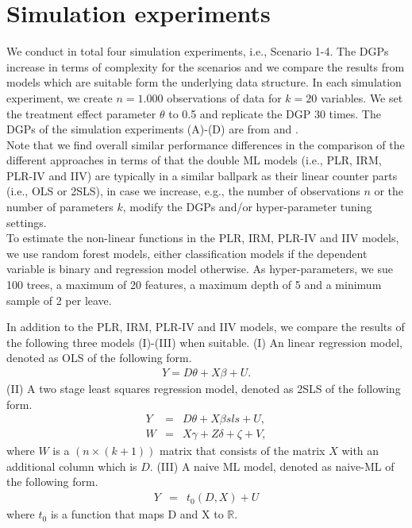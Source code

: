 \documentclass[10pt]{article}
\begin{document}
\section{Simulation experiments}
We conduct in total four simulation experiments, i.e., Scenario 1-4. 
The DGPs increase in terms of complexity for the scenarios and we compare the results from models which are suitable form the underlying data structure.
In each simulation experiment, we create $n=1.000$ observations of data for $k=20$ variables.
We set the treatment effect parameter $\theta$ to 0.5 and replicate the DGP 30 times.
The DGPs of the simulation experiments (A)-(D) are from \cite{Bach2022} and \cite{Bach2021}.\\

Note that we find overall similar performance differences in the comparison of the different approaches in terms of that the double ML models (i.e., PLR, IRM, PLR-IV and IIV) are typically in a similar ballpark as their linear counter parts (i.e., OLS or 2SLS), in case we increase, e.g., the number of observations $n$ or the number of parameters $k$, modify the DGPs and/or hyper-parameter tuning settings.\\


To estimate the non-linear functions in the PLR, IRM, PLR-IV and IIV models, we use random forest models, either classification models if the dependent variable is binary and regression model otherwise.
As hyper-parameters, we sue  100 trees, a maximum of 20 features, a maximum depth of 5 and a minimum sample of 2 per leave.

In addition to the PLR, IRM, PLR-IV and IIV models, we compare the results of the following three models (I)-(III) when suitable.
(I) An linear regression model, denoted as OLS of the following form. 
\begin{eqnarray*}\label{ols}
	Y= D \theta + X \beta + U.
\end{eqnarray*}
(II) A two stage least squares regression model, denoted as 2SLS of the following form. 
\begin{eqnarray*}\label{ols}
	Y &=& D \theta + X \beta sls+ U,\\
	W &=& X \gamma + Z \delta + \zeta + V,
\end{eqnarray*}
where $W$ is a $(n \times (k+1))$ matrix that consists of the matrix $X$ with an additional column which is $D$. 
(III) A naive ML model, denoted as naive-ML of the following form. 
\begin{eqnarray*}\label{ols}
	Y &=& t_0(D, X) + U
\end{eqnarray*}
where $t_0$ is a function that maps D and X to $\mathbb{R}$.
\end{document}
